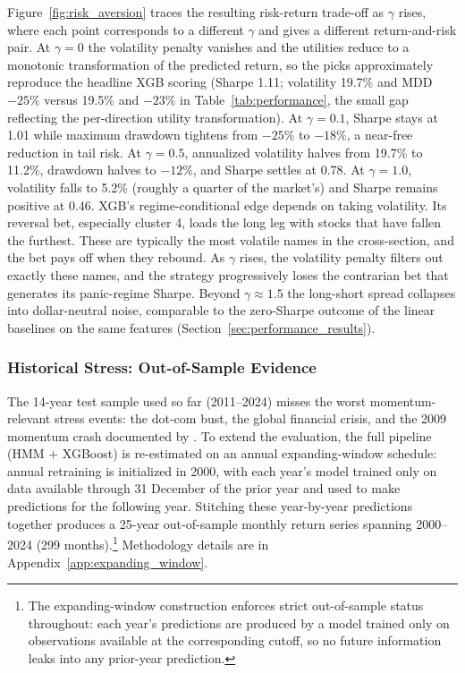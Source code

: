 Figure~\ref{fig:risk_aversion} traces the resulting risk-return trade-off as $\gamma$ rises, where each point corresponds to a different $\gamma$ and gives a different return-and-risk pair. At $\gamma=0$ the volatility penalty vanishes and the utilities reduce to a monotonic transformation of the predicted return, so the picks approximately reproduce the headline XGB scoring (Sharpe 1.11; volatility 19.7\% and MDD $-25\%$ versus 19.5\% and $-23\%$ in Table~\ref{tab:performance}, the small gap reflecting the per-direction utility transformation). At $\gamma = 0.1$, Sharpe stays at 1.01 while maximum drawdown tightens from $-25\%$ to $-18\%$, a near-free reduction in tail risk. At $\gamma = 0.5$, annualized volatility halves from 19.7\% to 11.2\%, drawdown halves to $-12\%$, and Sharpe settles at 0.78. At $\gamma = 1.0$, volatility falls to 5.2\% (roughly a quarter of the market's) and Sharpe remains positive at 0.46. XGB's regime-conditional edge depends on taking volatility. Its reversal bet, especially cluster 4, loads the long leg with stocks that have fallen the furthest. These are typically the most volatile names in the cross-section, and the bet pays off when they rebound. As $\gamma$ rises, the volatility penalty filters out exactly these names, and the strategy progressively loses the contrarian bet that generates its panic-regime Sharpe. Beyond $\gamma \approx 1.5$ the long-short spread collapses into dollar-neutral noise, comparable to the zero-Sharpe outcome of the linear baselines on the same features (Section~\ref{sec:performance_results}).

\subsubsection{Historical Stress: Out-of-Sample Evidence}\label{sec:historical_stress}

The 14-year test sample used so far (2011--2024) misses the worst momentum-relevant stress events: the dot-com bust, the global financial crisis, and the 2009 momentum crash documented by \citet{DanielMoskowitz2016}. To extend the evaluation, the full pipeline (HMM + XGBoost) is re-estimated on an annual expanding-window schedule: annual retraining is initialized in 2000, with each year's model trained only on data available through 31 December of the prior year and used to make predictions for the following year. Stitching these year-by-year predictions together produces a 25-year out-of-sample monthly return series spanning 2000--2024 (299 months).\footnote{The expanding-window construction enforces strict out-of-sample status throughout: each year's predictions are produced by a model trained only on observations available at the corresponding cutoff, so no future information leaks into any prior-year prediction.} Methodology details are in Appendix~\ref{app:expanding_window}.

